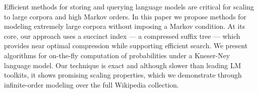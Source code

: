 Efficient methods for storing and querying language models are critical for scaling to large corpora and high Markov orders. In this paper we propose methods for modeling extremely large corpora without imposing a Markov condition. At its core, our approach uses a succinct index --- a compressed suffix tree --- which provides near optimal compression while supporting efficient search. We present algorithms for on-the-fly computation of probabilities under a Kneser-Ney language model. Our technique is exact and although slower than leading LM toolkits, it shows promising scaling properties, which we demonstrate through infinite-order modeling over the full Wikipedia collection.
